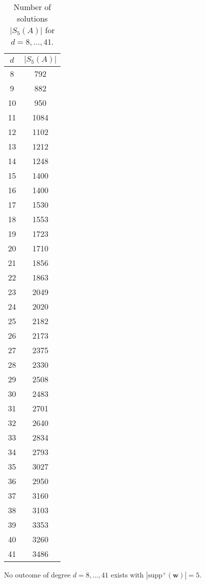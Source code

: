 \begin{table}
    \centering
    \begin{tabular}{|c|c|}
    \hline
    \( d \) & \( \lvert S_5(A) \rvert \) \\ \hline
    8  & 792  \\ \hline
    9  & 882  \\ \hline
    10 & 950  \\ \hline
    11 & 1084 \\ \hline
    12 & 1102 \\ \hline
    13 & 1212 \\ \hline
    14 & 1248 \\ \hline
    15 & 1400 \\ \hline
    16 & 1400 \\ \hline
    17 & 1530 \\ \hline
    18 & 1553 \\ \hline
    19 & 1723 \\ \hline
    20 & 1710 \\ \hline
    21 & 1856 \\ \hline
    22 & 1863 \\ \hline
    23 & 2049 \\ \hline
    24 & 2020 \\ \hline
    25 & 2182 \\ \hline
    26 & 2173 \\ \hline
    27 & 2375 \\ \hline
    28 & 2330 \\ \hline
    29 & 2508 \\ \hline
    30 & 2483 \\ \hline
    31 & 2701 \\ \hline
    32 & 2640 \\ \hline
    33 & 2834 \\ \hline
    34 & 2793 \\ \hline
    35 & 3027 \\ \hline
    36 & 2950 \\ \hline
    37 & 3160 \\ \hline
    38 & 3103 \\ \hline
    39 & 3353 \\ \hline
    40 & 3260 \\ \hline
    41 & 3486 \\ \hline
    \end{tabular}
    \caption{Number of solutions \( \lvert S_5(A) \rvert \) for \( d = 8, \dots, 41 \).}
    \label{tab:solutions324324324}
\end{table}

\begin{proposition}
    No outcome of degree \( d = 8, \dots, 41 \) exists with \( |\mathrm{supp}^+(\mathbf w)| = 5 \).
\end{proposition}
